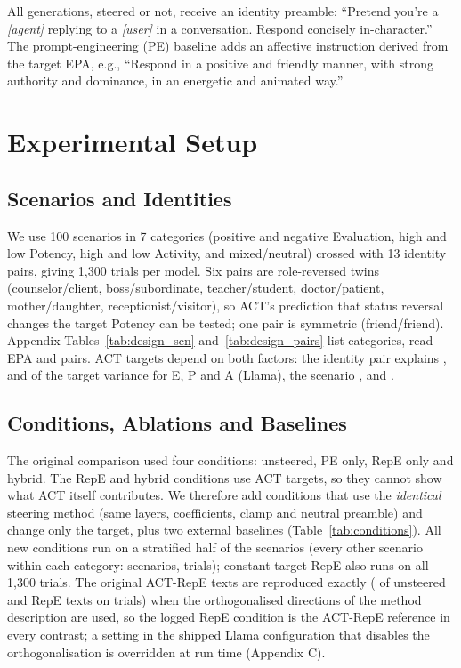 \documentclass[letterpaper]{article} %
\begin{document}
All generations, steered or not, receive an identity preamble: ``Pretend you're a \textit{[agent]} replying to a \textit{[user]} in a conversation. Respond concisely in-character.'' The prompt-engineering (PE) baseline adds an affective instruction derived from the target EPA, e.g., ``Respond in a positive and friendly manner, with strong authority and dominance, in an energetic and animated way.''

\section{Experimental Setup}

\subsection{Scenarios and Identities}

We use 100 scenarios in 7 categories (positive and negative Evaluation, high and low Potency, high and low Activity, and mixed/neutral) crossed with 13 identity pairs, giving 1,300 trials per model. Six pairs are role-reversed twins (counselor/client, boss/subordinate, teacher/student, doctor/patient, mother/daughter, receptionist/visitor), so ACT's prediction that status reversal changes the target Potency can be tested; one pair is symmetric (friend/friend). Appendix Tables~\ref{tab:design_scn} and~\ref{tab:design_pairs} list categories, read EPA and pairs. ACT targets depend on both factors: the identity pair explains \DesignRtwoPairE, \DesignRtwoPairP and \DesignRtwoPairA of the target variance for E, P and A (Llama), the scenario \DesignRtwoScnE, \DesignRtwoScnP and \DesignRtwoScnA. \ScenarioProvenance

\subsection{Conditions, Ablations and Baselines}

The original comparison used four conditions: unsteered, PE only, RepE only and hybrid. The RepE and hybrid conditions use ACT targets, so they cannot show what ACT itself contributes. We therefore add conditions that use the \emph{identical} steering method (same layers, coefficients, clamp and neutral preamble) and change only the target, plus two external baselines (Table~\ref{tab:conditions}). All new conditions run on a stratified half of the scenarios (every other scenario within each category: \SubsetScenarios scenarios, \SubsetTrials trials); constant-target RepE also runs on all 1,300 trials. The original ACT-RepE texts are reproduced exactly (\ReproIdentical{} of \ReproTotal{} unsteered and RepE texts on \ReproTrials{} trials) when the orthogonalised directions of the method description are used, so the logged RepE condition is the ACT-RepE reference in every contrast; a setting in the shipped Llama configuration that disables the orthogonalisation is overridden at run time (Appendix C).
\end{document}
